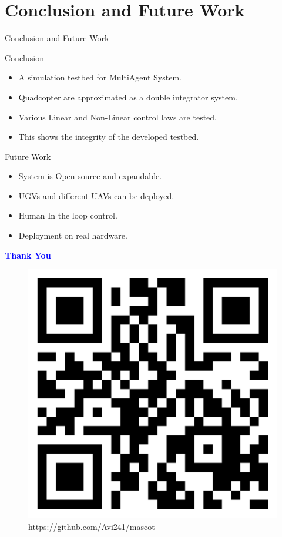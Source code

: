 \documentclass[10pt]{beamer}
\begin{document}
\section{Conclusion and Future Work}
\begin{frame}{Conclusion and Future Work}
	\begin{block}{Conclusion}
		\begin{itemize}
			\item A simulation testbed for MultiAgent System.
			\item Quadcopter are approximated as a double integrator system.
			\item Various Linear and Non-Linear control laws are tested.
			\item This shows the integrity of the developed testbed.
		\end{itemize}
	\end{block}

	\pause \begin{block}{Future Work}
		\begin{itemize}
			\item System is Open-source and expandable.
			\item UGVs and different UAVs can be deployed.
			\item Human In the loop control.
			\item Deployment on real hardware.
		\end{itemize}
	\end{block}
\end{frame}
\begin{frame}{}
	\vspace*{1.5 cm}
	\Huge{\centerline{\textcolor{blue}{\textbf{Thank You}}}}
	\vspace*{0.8 cm}
	\begin{figure}[h!]
		\centering
		\includegraphics[scale=0.13]{qrcode.png}
		\caption{https://github.com/Avi241/mascot}
		\label{Fig:github}
	\end{figure}

\end{frame}

\end{document}
